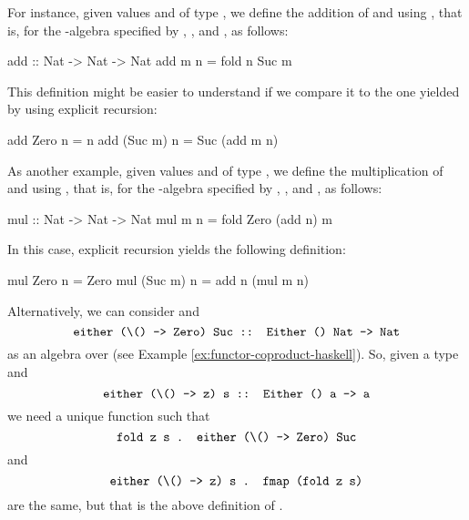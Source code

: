 \begin{example}
  For instance, given values  and  of
  type , we define the addition of 
  and  using , that is,
   for the -algebra specified by
  , , and , as
  follows:
  \begin{codehaskell}
add :: Nat -> Nat -> Nat
add m n = fold n Suc m
  \end{codehaskell}
  This definition might be easier to understand if we compare it to
  the one yielded by using explicit recursion:
  \begin{codehaskell}
add Zero    n = n
add (Suc m) n = Suc (add m n)
  \end{codehaskell}

  As another example, given values  and 
  of type , we define the multiplication of
   and  using , that is,  for the
  -algebra specified by ,
  , and , as follows:
  \begin{codehaskell}
mul :: Nat -> Nat -> Nat
mul m n = fold Zero (add n) m
  \end{codehaskell}
  In this case, explicit recursion yields the following definition:
  \begin{codehaskell}
mul Zero    n = Zero
mul (Suc m) n = add n (mul m n)
  \end{codehaskell}

\end{example}

Alternatively, we can consider  and
\begin{equation*}
  \text{\texttt{either (\textbackslash () -> Zero) Suc :: Either () Nat -> Nat}}
\end{equation*}
as an algebra over  (see Example
\ref{ex:functor-coproduct-haskell}). So, given a type 
and
\begin{equation*}
  \text{\texttt{either (\textbackslash () -> z) s :: Either () a -> a}}
\end{equation*}
we need a unique function  such that
\begin{equation*}
  \text{\texttt{fold z s . either (\textbackslash () -> Zero) Suc}}
\end{equation*}
and
\begin{equation*}
  \text{\texttt{either (\textbackslash () -> z) s . fmap (fold z s)}}
\end{equation*}
are the same, but that is the above definition of .

